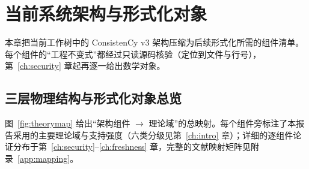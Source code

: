 \chapter{当前系统架构与形式化对象}\label{ch:arch}

本章把当前工作树中的 ConsistenCy v3 架构压缩为后续形式化所需的组件清单。每个组件的“工程不变式”都经过只读源码核验（定位到文件与行号），第~\ref{ch:security} 章起再逐一给出数学对象。

\section{三层物理结构与形式化对象总览}

图~\ref{fig:theorymap} 给出“架构组件 $\rightarrow$ 理论域”的总映射。每个组件旁标注了本报告采用的主要理论域与支持强度（六类分级见第~\ref{ch:intro} 章）；详细的逐组件论证分布于第~\ref{ch:security}--\ref{ch:freshness} 章，完整的文献映射矩阵见附录~\ref{app:mapping}。

